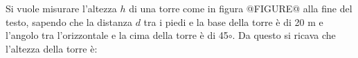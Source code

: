 Si vuole misurare l'altezza $h$ di una torre 
come in figura @FIGURE@ alla 
fine del testo, 
sapendo che la distanza $d$ tra i piedi e la base della torre è di 20 m e 
l'angolo tra l'orizzontale e la cima della torre è di 45$\circ$.  
Da questo si ricava che l'altezza della torre è:
